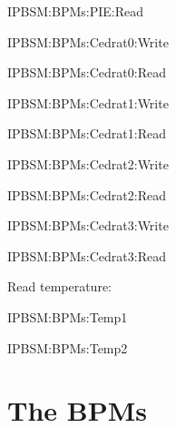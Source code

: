 IPBSM:BPMs:PIE:Read\par 
IPBSM:BPMs:Cedrat0:Write\par 
IPBSM:BPMs:Cedrat0:Read\par 
IPBSM:BPMs:Cedrat1:Write\par 
IPBSM:BPMs:Cedrat1:Read\par 
IPBSM:BPMs:Cedrat2:Write\par 
IPBSM:BPMs:Cedrat2:Read\par 
IPBSM:BPMs:Cedrat3:Write\par 
IPBSM:BPMs:Cedrat3:Read\par 
Read temperature:\par 
IPBSM:BPMs:Temp1\par 
IPBSM:BPMs:Temp2\par

\section{The BPMs}
